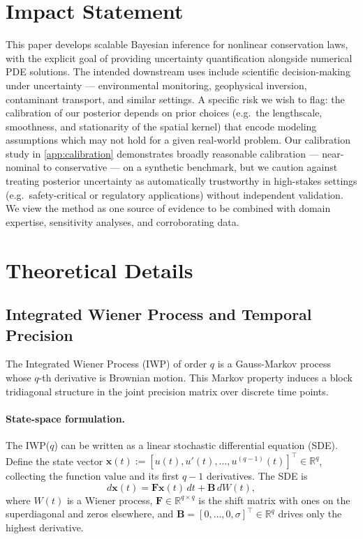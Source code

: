 \documentclass{article}
\theoremstyle{plain}
\theoremstyle{definition}
\theoremstyle{remark}
\newcommand{\R}{\mathbb{R}}
\begin{document}
\section*{Impact Statement}

This paper develops scalable Bayesian inference for nonlinear conservation laws, with the explicit goal of providing uncertainty quantification alongside numerical PDE solutions.
The intended downstream uses include scientific decision-making under uncertainty --- environmental monitoring, geophysical inversion, contaminant transport, and similar settings.
A specific risk we wish to flag: the calibration of our posterior depends on prior choices (e.g.\ the lengthscale, smoothness, and stationarity of the spatial kernel) that encode modeling assumptions which may not hold for a given real-world problem.
Our calibration study in \cref{app:calibration} demonstrates broadly reasonable calibration --- near-nominal to conservative --- on a synthetic benchmark, but we caution against treating posterior uncertainty as automatically trustworthy in high-stakes settings (e.g.\ safety-critical or regulatory applications) without independent validation.
We view the method as one source of evidence to be combined with domain expertise, sensitivity analyses, and corroborating data.






\newpage
\appendix
\onecolumn

\section{Theoretical Details}
\label{app:theory}

\subsection{Integrated Wiener Process and Temporal Precision}
\label{app:iwp}

The Integrated Wiener Process (IWP) of order $q$ is a Gauss-Markov process whose $q$-th derivative is Brownian motion.
This Markov property induces a block tridiagonal structure in the joint precision matrix over discrete time points.

\paragraph{State-space formulation.}
The IWP($q$) can be written as a linear stochastic differential equation (SDE).
Define the state vector $\bm{x}(t) := [u(t), u'(t), \ldots, u^{(q-1)}(t)]^\top \in \R^q$, collecting the function value and its first $q-1$ derivatives.
The SDE is
\begin{equation}
  d\bm{x}(t) = \bm{F} \bm{x}(t) \, dt + \bm{B} \, dW(t),
  \label{eq:iwp-sde}
\end{equation}
where $W(t)$ is a Wiener process, $\bm{F} \in \R^{q \times q}$ is the shift matrix with ones on the superdiagonal and zeros elsewhere, and $\bm{B} = [0, \ldots, 0, \sigma]^\top \in \R^q$ drives only the highest derivative.
\end{document}
